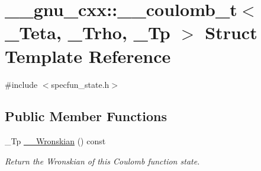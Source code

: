 \hypertarget{struct____gnu__cxx_1_1____coulomb__t}{}\section{\+\_\+\+\_\+gnu\+\_\+cxx\+:\+:\+\_\+\+\_\+coulomb\+\_\+t$<$ \+\_\+\+Teta, \+\_\+\+Trho, \+\_\+\+Tp $>$ Struct Template Reference}
\label{struct____gnu__cxx_1_1____coulomb__t}


{\ttfamily \#include $<$specfun\+\_\+state.\+h$>$}

\subsection*{Public Member Functions}
\begin{DoxyCompactItemize}
\item 
\+\_\+\+Tp \hyperlink{struct____gnu__cxx_1_1____coulomb__t_a94a8dbe4756e2b8b7241d5a66c6e6b3d}{\+\_\+\+\_\+\+Wronskian} () const
\begin{DoxyCompactList}\small\item\em Return the Wronskian of this Coulomb function state. \end{DoxyCompactList}\end{DoxyCompactItemize}
